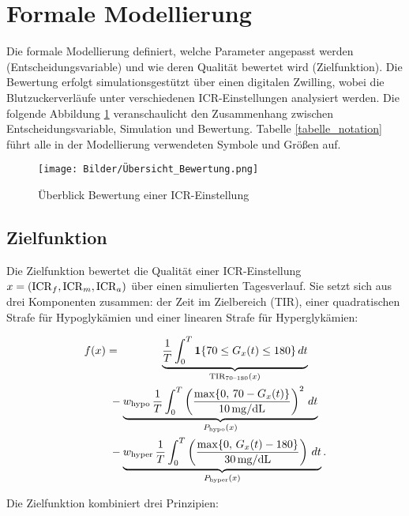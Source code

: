 \section{Formale Modellierung} \label{modellierung}

Die formale Modellierung definiert, welche Parameter angepasst werden (Entscheidungsvariable) und wie deren Qualität bewertet wird (Zielfunktion). Die Bewertung erfolgt simulationsgestützt über einen digitalen Zwilling, wobei die Blutzuckerverläufe unter verschiedenen ICR-Einstellungen analysiert werden. Die folgende Abbildung \ref{fig:überblick} veranschaulicht den Zusammenhang zwischen Entscheidungsvariable, Simulation und Bewertung. Tabelle \ref{tabelle_notation} führt alle in der Modellierung verwendeten Symbole und Größen auf.

\begin{figure}[h!]
    \centering
    \texttt{[image: Bilder/Übersicht\_Bewertung.png]}
    \caption{Überblick Bewertung einer ICR-Einstellung}
    \label{fig:überblick}
\end{figure}

\subsection{Zielfunktion}

Die Zielfunktion bewertet die Qualität einer ICR-Einstellung \(x = (\mathrm{ICR}_f, \mathrm{ICR}_m, \mathrm{ICR}_a)\) über einen simulierten Tagesverlauf. Sie setzt sich aus drei Komponenten zusammen: der Zeit im Zielbereich (TIR), einer quadratischen Strafe für Hypoglykämien und einer linearen Strafe für Hyperglykämien:

\begin{align}
f(x)
&= \phantom{-\,w_{\mathrm{hypo}}\,}\underbrace{\frac{1}{T}\int_{0}^{T}\Ind\{70 \le G_{x}(t) \le 180\}\,dt}_{\mathrm{TIR}_{70\text{--}180}(x)} \nonumber\\
&\ - \underbrace{w_{\mathrm{hypo}}\,\frac{1}{T}\int_{0}^{T}\left(\frac{\max\{0,\,70 - G_{x}(t)\}}{\Hhypo}\right)^{2}\,dt}_{P_{\mathrm{hypo}}(x)} \nonumber\\
&\ - \underbrace{w_{\mathrm{hyper}}\,\frac{1}{T}\int_{0}^{T}\left(\frac{\max\{0,\,G_{x}(t) - 180\}}{\Hhyper}\right)\,dt}_{P_{\mathrm{hyper}}(x)}.
\end{align}

\noindent Die Zielfunktion kombiniert drei Prinzipien:

